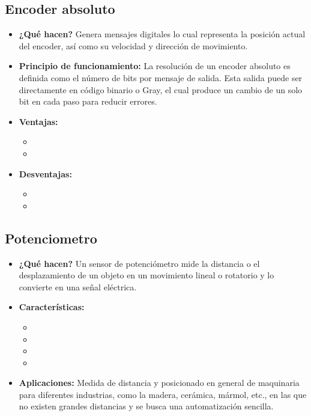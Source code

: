 \subsection*{Encoder absoluto}
\begin{itemize}
	\item \textbf{¿Qué hacen?} Genera mensajes digitales lo cual representa la posición actual del encoder, así como su velocidad y dirección de movimiento.
	\item \textbf{Principio de funcionamiento:} La resolución de un encoder absoluto es definida como el número de bits por mensaje de salida. Esta salida puede ser directamente en código binario o Gray, el cual produce un cambio de un solo bit en cada paso para reducir errores.
	\item \textbf{Ventajas:} 
	\begin{itemize}
		\item {} 
		\item {} 
	\end{itemize}
	\item \textbf{Desventajas:}
	\begin{itemize}
		\item {} 
		\item {} 
	\end{itemize}
\end{itemize}




\subsection*{Potenciometro}
\begin{itemize}
	\item \textbf{¿Qué hacen?} Un sensor de potenciómetro mide la distancia o el desplazamiento de un objeto en un movimiento lineal o rotatorio y lo convierte en una señal eléctrica.
	\item \textbf{Características:}
	\begin{itemize}
		\item {} 
		\item {} 
		\item {} 
		\item {}
	\end{itemize}
	
	\item \textbf{Aplicaciones:} Medida de distancia y posicionado en general de maquinaria para diferentes industrias, como la madera, cerámica, mármol, etc., en las que no existen grandes distancias y se busca una automatización sencilla.
\end{itemize}



